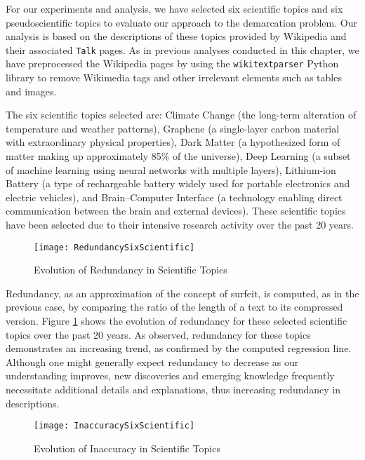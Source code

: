 For our experiments and analysis, we have selected six scientific topics and six pseudoscientific topics to evaluate our approach to the demarcation problem. Our analysis is based on the descriptions of these topics provided by Wikipedia and their associated \texttt{Talk} pages. As in previous analyses conducted in this chapter, we have preprocessed the Wikipedia pages by using the \texttt{wikitextparser} Python library to remove Wikimedia tags and other irrelevant elements such as tables and images.

The six scientific topics selected are: Climate Change (the long-term alteration of temperature and weather patterns), Graphene (a single-layer carbon material with extraordinary physical properties), Dark Matter (a hypothesized form of matter making up approximately 85\% of the universe), Deep Learning (a subset of machine learning using neural networks with multiple layers), Lithium-ion Battery (a type of rechargeable battery widely used for portable electronics and electric vehicles), and Brain–Computer Interface (a technology enabling direct communication between the brain and external devices). These scientific topics have been selected due to their intensive research activity over the past 20 years.

\begin{figure}[H]
\centering\texttt{[image: RedundancySixScientific]}
\caption{\label{fig:redundancy_six_scientific}Evolution of Redundancy in Scientific Topics}
\end{figure}

Redundancy, as an approximation of the concept of surfeit, is computed, as in the previous case, by comparing the ratio of the length of a text to its compressed version. Figure \ref{fig:redundancy_six_scientific} shows the evolution of redundancy for these selected scientific topics over the past 20 years. As observed, redundancy for these topics demonstrates an increasing trend, as confirmed by the computed regression line. Although one might generally expect redundancy to decrease as our understanding improves, new discoveries and emerging knowledge frequently necessitate additional details and explanations, thus increasing redundancy in descriptions.

\begin{figure}[H]
\centering\texttt{[image: InaccuracySixScientific]}
\caption{\label{fig:inaccuracy_six_scientific}Evolution of Inaccuracy in Scientific Topics}
\end{figure}


